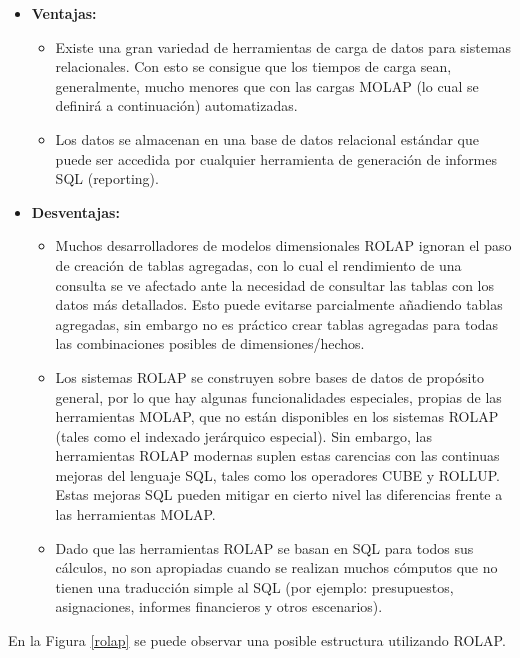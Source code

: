 \documentclass[a4paper,11pt]{article}
\begin{document}
    \begin{itemize}
      \item \textbf{Ventajas:}
        \begin{itemize}
          \item Existe una gran variedad de herramientas de carga de datos para sistemas relacionales. Con esto se consigue que los tiempos de carga
          sean, generalmente, mucho menores que con las cargas MOLAP (lo cual se definirá a continuación) automatizadas.
          \item Los datos se almacenan en una base de datos relacional estándar que puede ser accedida por cualquier herramienta de generación de
          informes SQL (reporting).
        \end{itemize}
      \item \textbf{Desventajas:}
        \begin{itemize}
          \item Muchos desarrolladores de modelos dimensionales ROLAP ignoran el paso de creación de tablas agregadas, con lo cual el rendimiento de
          una consulta se ve afectado ante la necesidad de consultar las tablas con los datos más detallados. Esto puede evitarse parcialmente
          añadiendo tablas agregadas, sin embargo no es práctico crear tablas agregadas para todas las combinaciones posibles de dimensiones/hechos.
          \item Los sistemas ROLAP se construyen sobre bases de datos de propósito general, por lo que hay algunas funcionalidades especiales, propias
          de las herramientas MOLAP, que no están disponibles en los sistemas ROLAP (tales como el indexado jerárquico especial). Sin embargo, las
          herramientas ROLAP modernas suplen estas carencias con las continuas mejoras del lenguaje SQL, tales como los operadores CUBE y ROLLUP.
          Estas mejoras SQL pueden mitigar en cierto nivel las diferencias frente a las herramientas MOLAP.
          \item Dado que las herramientas ROLAP se basan en SQL para todos sus cálculos, no son apropiadas cuando se realizan muchos cómputos que
          no tienen una traducción simple al SQL (por ejemplo: presupuestos, asignaciones, informes financieros y otros escenarios).
        \end{itemize}
    \end{itemize}
    
    En la Figura \ref{rolap} se puede observar una posible estructura utilizando ROLAP.
    
\end{document}
